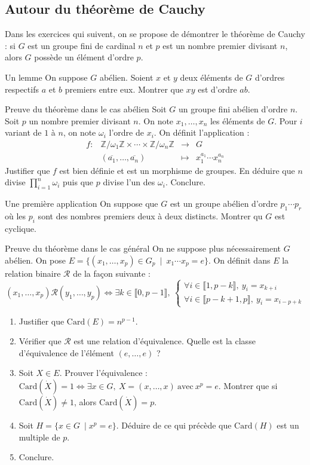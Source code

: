\documentclass[french,a4paper]{article}
\newcommand{\Z}{\mathbb{Z}}
\newcommand{\card}{\text{Card}}
\theoremstyle{plain}
\theoremstyle{definition}
\theoremstyle{remark}
\begin{document}
\subsection{Autour du théorème de Cauchy}
Dans les exercices qui suivent, on se propose de démontrer le théorème de Cauchy : si $G$ est un groupe fini de cardinal $n$ et $p$ est un nombre premier divisant $n$, alors $G$ possède un élément d'ordre $p$.
\begin{ex}{Un lemme}
	On suppose $G$ abélien. Soient $x$ et $y$ deux éléments de $G$ d'ordres respectifs $a$ et $b$ premiers entre eux. Montrer que $xy$ est d'ordre $ab$.
\end{ex}
\begin{ex}{Preuve du théorème dans le cas abélien}
	Soit $G$ un groupe fini abélien d'ordre $n$. Soit $p$ un nombre premier divisant $n$. On note $x_1,\ldots,x_n$ les éléments de $G$. Pour $i$ variant de $1$ à $n$, on note $\omega_i$ l'ordre de $x_i$. On définit l'application : $$\begin{array}{lrcl}
		f:&\Z/\omega_1\Z\times\cdots\times\Z/\omega_n\Z&\longrightarrow&G \\
		&(\overline{a_1},\ldots,\overline{a_n})&\longmapsto&x_1^{a_1}\cdots x_n^{a_n}
	\end{array}$$ Justifier que $f$ est bien définie et est un morphisme de groupes. En déduire que $n$ divise $\displaystyle\prod_{i=1}^{n}\omega_i$ puis que $p$ divise l'un des $\omega_i$. Conclure.
\end{ex}
\begin{ex}{Une première application}
	On suppose que $G$ est un groupe abélien d'ordre $p_1\cdots p_r$ où les $p_i$ sont des nombres premiers deux à deux distincts. Montrer qu $G$ est cyclique.
\end{ex}
\begin{ex}{Preuve du théorème dans le cas général}
	On ne suppose plus nécessairement $G$ abélien. On pose $E=\{(x_1,\ldots,x_p)\in G_p\ \mid\ x_1\cdots x_p=e\}$. On définit dans $E$ la relation binaire $\mathcal{R}$ de la façon suivante : $$(x_1,\ldots,x_p)\mathcal{R}(y_1,\ldots,y_p)\iff \exists k\in\llbracket0,p-1\rrbracket,\ \begin{cases}
		\forall i\in\llbracket1,p-k\rrbracket,\ y_i=x_{k+i}\\ \forall i\in\llbracket p-k+1,p\rrbracket,\ y_i=x_{i-p+k}
	\end{cases}$$
	\begin{enumerate}
		\item Justifier que $\card(E)=n^{p-1}$.
		\item Vérifier que $\mathcal{R}$ est une relation d'équivalence. Quelle est la classe d'équivalence de l'élément $(e,\ldots,e)$ ?
		\item Soit $X\in E$. Prouver l'équivalence : $\card(\dot{X})=1\iff\exists x\in G,\ X=(x,\ldots,x)\ \text{avec}\ x^p=e$. Montrer que si $\card(\dot{X})\ne 1$, alors $\card(\dot{X})=p$.
		\item Soit $H=\{x\in G\ \mid x^p=e\}$. Déduire de ce qui précède que $\card(H)$ est un multiple de $p$.
		\item Conclure.
	\end{enumerate}
\end{ex}
\end{document}
